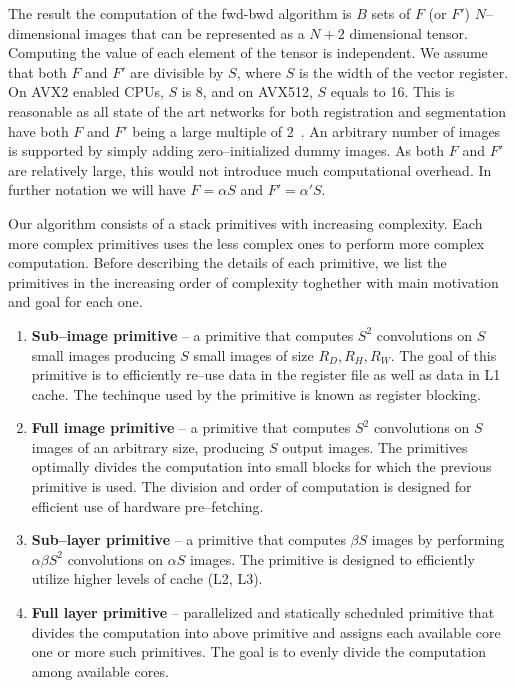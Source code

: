   The result the computation of the fwd-bwd algorithm is $B$ sets of
  $F$ (or $F'$) $N$--dimensional images that can be represented as a
  $N+2$ dimensional tensor.  Computing the value of each element of
  the tensor is independent.  We assume that both $F$ and $F'$ are
  divisible by $S$, where $S$ is the width of the vector register.  On
  AVX2 enabled CPUs, $S$ is 8, and on AVX512, $S$ equals to 16.  This
  is reasonable as all state of the art networks for both registration
  and segmentation have both $F$ and $F'$ being a large multiple of
  $2$~\cite{krizhevsky2012imagenet, ronneberger2015u,
    simonyan2014very, sermanet2013overfeat, long2015fully,
    tran2015learning, ji20133d, maturana_iros_2015,
    maturana_icra_2014}.  An arbitrary number of images is supported
  by simply adding zero--initialized dummy images.  As both $F$ and
  $F'$ are relatively large, this would not introduce much
  computational overhead.  In further notation we will have $F =
  \alpha S$ and $F' = \alpha' S$.

  Our algorithm consists of a stack primitives with increasing
  complexity.  Each more complex primitives uses the less complex ones
  to perform more complex computation.  Before describing the details
  of each primitive, we list the primitives in the increasing order of
  complexity toghether with main motivation and goal for each one.

  \begin{enumerate}
  \item {\bf Sub--image primitive} -- a primitive that computes $S^2$
    convolutions on $S$ small images producing $S$ small images of
    size $R_D, R_H, R_W$.  The goal of this primitive is to
    efficiently re--use data in the register file as well as data in
    L1 cache.  The techinque used by the primitive is known as
    register blocking.
  \item {\bf Full image primitive} -- a primitive that computes $S^2$
    convolutions on $S$ images of an arbitrary size, producing $S$
    output images.  The primitives optimally divides the computation
    into small blocks for which the previous primitive is used.  The
    division and order of computation is designed for efficient use of
    hardware pre--fetching.
  \item {\bf Sub--layer primitive} -- a primitive that computes
    $\beta S$ images by performing $\alpha \beta S^2$
    convolutions on $\alpha S$ images.  The primitive is designed to
    efficiently utilize higher levels of cache (L2, L3).
  \item {\bf Full layer primitive} -- parallelized and statically
    scheduled primitive that divides the computation into above
    primitive and assigns each available core one or more such
    primitives.  The goal is to evenly divide the computation among
    available cores.
  \end{enumerate}

